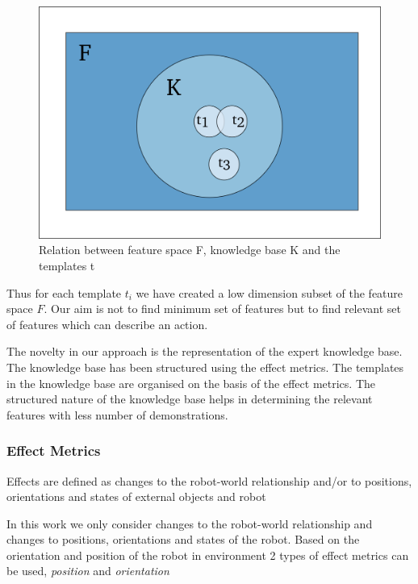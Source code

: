 \begin{figure}[htp]
\centering
\includegraphics[scale=0.50]{images/feature_space.png}
\caption[Feature space venn diagram]{Relation between feature space F, knowledge base K and the templates t}
\label{}
\end{figure}
Thus for each template $t_i$ we have created a low dimension subset of the feature space $F$.
Our aim is not to find minimum set of features but to find relevant set of features which can describe an action.


The novelty in our approach is the representation of the expert knowledge base.
The knowledge base has been structured using the effect metrics. 
The templates in the knowledge base are organised on the basis of the effect metrics.
The structured nature of the knowledge base helps in determining the relevant features with
less number of demonstrations.
\subsubsection{Effect Metrics}
Effects are defined as changes to the robot-world relationship and/or to positions, orientations
and states of external objects and robot \cite{alissandrakis_action_2006}

In this work we only consider changes to the robot-world relationship and changes to positions, orientations and states of the robot. Based on the orientation and position of the 
robot in environment 2 types of effect metrics can be used, \textit{position} and \textit{orientation}

